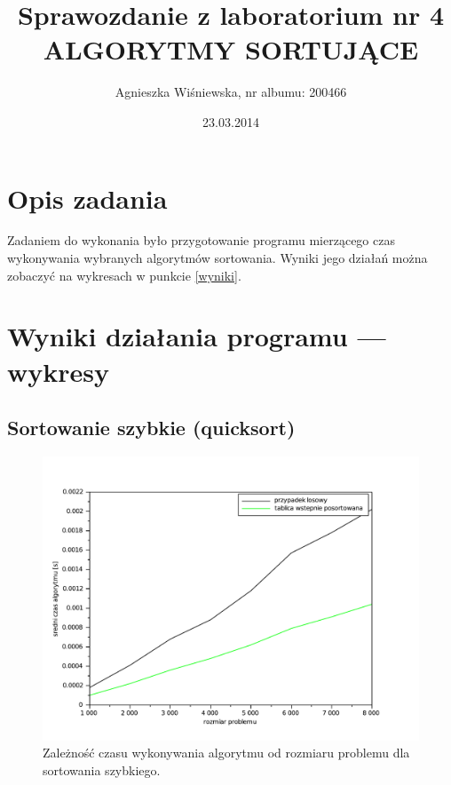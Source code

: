 \documentclass{mwart}
\title{\Huge{Sprawozdanie z laboratorium nr 4 \\
ALGORYTMY SORTUJĄCE}}
\author{Agnieszka Wiśniewska, nr albumu: 200466}
\date{23.03.2014}
\begin{document}
\maketitle

\section{Opis zadania\label{wstep}}

Zadaniem do wykonania było przygotowanie programu mierzącego czas wykonywania wybranych algorytmów sortowania. Wyniki jego działań można zobaczyć na wykresach w punkcie \ref{wyniki}.

\section{Wyniki działania programu --- wykresy\label{wyniki}}
\subsection {Sortowanie szybkie (quicksort)}

\begin{figure}[!htp]
\centering
\includegraphics[width=\textwidth]{files/quick.pdf}
\caption{Zależność czasu wykonywania algorytmu od rozmiaru problemu dla sortowania szybkiego. \label{quicksort}} 
\end{figure}


\newpage
\end{document}
